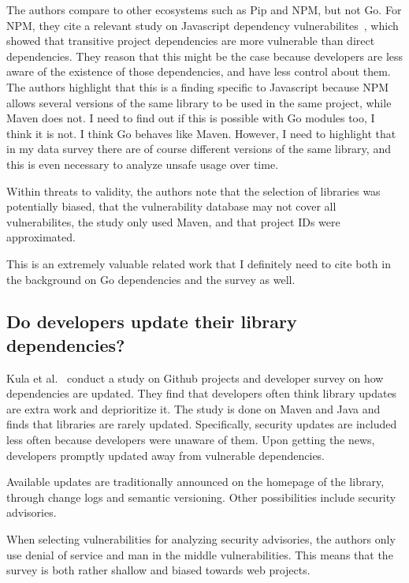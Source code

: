 The authors compare to other ecosystems such as Pip and NPM, but not Go.
For NPM, they cite a relevant study on Javascript dependency vulnerabilites~\cite{lauinger2017}, which showed that
transitive project dependencies are more vulnerable than direct dependencies.
They reason that this might be the case because developers are less aware of the existence of those dependencies, and
have less control about them.
The authors highlight that this is a finding specific to Javascript because NPM allows several versions of the same
library to be used in the same project, while Maven does not.
I need to find out if this is possible with Go modules too, I think it is not.
I think Go behaves like Maven.
However, I need to highlight that in my data survey there are of course different versions of the same library, and this
is even necessary to analyze unsafe usage over time.

Within threats to validity, the authors note that the selection of libraries was potentially biased, that the
vulnerability database may not cover all vulnerabilites, the study only used Maven, and that project IDs were approximated.

This is an extremely valuable related work that I definitely need to cite both in the background on Go dependencies
and the survey as well.



\subsection{Do developers update their library dependencies?}
\label{subsec:do-developers-update-their-library-dependencies?}

Kula et al.~\cite{kula2017} conduct a study on Github projects and developer survey on how dependencies are updated.
They find that developers often think library updates are extra work and deprioritize it.
The study is done on Maven and Java and finds that libraries are rarely updated.
Specifically, security updates are included less often because developers were unaware of them.
Upon getting the news, developers promptly updated away from vulnerable dependencies.

Available updates are traditionally announced on the homepage of the library, through change logs and semantic versioning.
Other possibilities include security advisories.

When selecting vulnerabilities for analyzing security advisories, the authors only use denial of service and man in the
middle vulnerabilities.
This means that the survey is both rather shallow and biased towards web projects.

